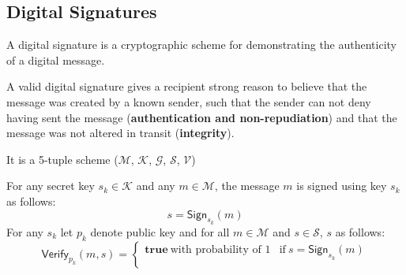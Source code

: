\documentclass[%
  slidesonly,%
  semlayer%
  ]{seminar}                                  %
\begin{document}
\begin{slide}
  \subsection*{Digital Signatures}
    \vfill
    A digital signature is a cryptographic scheme for demonstrating the authenticity of a digital message.
    
    A valid digital signature gives a recipient strong reason to believe that the message was created by a known sender, such that the sender can not deny having sent the message (\textbf{authentication and non-repudiation}) and that the message was not altered in transit (\textbf{integrity}).

    It is a 5-tuple scheme ($\mathcal{M}$, $\mathcal{K}$, $\mathcal{G}$, $\mathcal{S}$, $\mathcal{V}$)

    For any secret key $s_{k} \in \mathcal{K}$ and any $m \in \mathcal{M}$, the message $m$ is signed using key $s_{k}$ as follows:
      \begin{equation}
        s = \textsf{Sign}_{s_{k}}(m)
        \label{eq:signature}
      \end{equation}
    For any $s_{k}$ let $p_{k}$ denote public key and for all $m \in \mathcal{M}$ and $s \in \mathcal{S}$, $s$ as follows:
    \begin{equation}
      \textsf{Verify}_{p_{k}}(m,s) = 
      \begin{cases}
       \textbf{true}\ \mbox{with probability of 1} & \mbox{if}\ s = \textsf{Sign}_{s_{k}}(m)\\

\end{cases}
\end{equation}
\end{slide}
\end{document}
